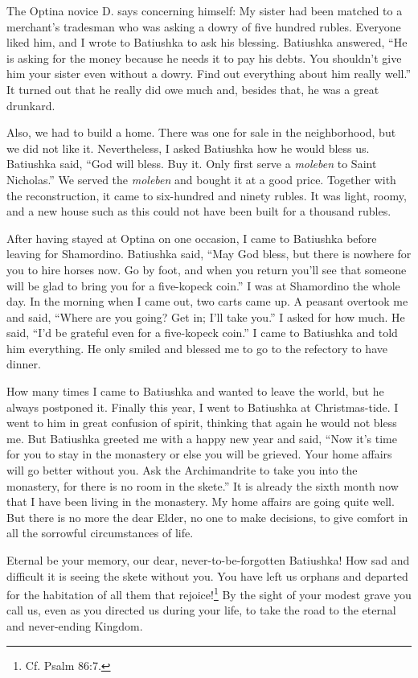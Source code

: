 \begin{longquote}{The Optina novice D. says concerning himself:}
My sister had been matched to a merchant's tradesman who was asking a dowry of five hundred rubles. Everyone liked him, and I wrote to Batiushka to ask his blessing. Batiushka answered, ``He is asking for the money because he needs it to pay his debts. You shouldn't give him your sister even without a dowry. Find out everything about him really well.'' It turned out that he really did owe much and, besides that, he was a great drunkard.

Also, we had to build a home. There was one for sale in the neighborhood, but we did not like it. Nevertheless, I asked Batiushka how he would bless us. Batiushka said, ``God will bless. Buy it. Only first serve a \textit{moleben} to Saint Nicholas.'' We served the \textit{moleben} and bought it at a good price. Together with the reconstruction, it came to six-hundred and ninety rubles. It was light, roomy, and a new house such as this could not have been built for a thousand rubles.

After having stayed at Optina on one occasion, I came to Batiushka before leaving for Shamordino. Batiushka said, ``May God bless, but there is nowhere for you to hire horses now. Go by foot, and when you return you'll see that someone will be glad to bring you for a five-kopeck coin.'' I was at Shamordino the whole day. In the morning when I came out, two carts came up. A peasant overtook me and said, ``Where are you going? Get in; I'll take you.'' I asked for how much. He said, ``I'd be grateful even for a five-kopeck coin.'' I came to Batiushka and told him everything. He only smiled and blessed me to go to the refectory to have dinner.

How many times I came to Batiushka and wanted to leave the world, but he always postponed it. Finally this year, I went to Batiushka at Christmas-tide. I went to him in great confusion of spirit, thinking that again he would not bless me. But Batiushka greeted me with a happy new year and said, ``Now it's time for you to stay in the monastery or else you will be grieved. Your home affairs will go better without you. Ask the Archimandrite to take you into the monastery, for there is no room in the skete.'' It is already the sixth month now that I have been living in the monastery. My home affairs are going quite well. But there is no more the dear Elder, no one to make decisions, to give comfort in all the sorrowful circumstances of life.

Eternal be your memory, our dear, never-to-be-forgotten Batiushka! How sad and difficult it is seeing the skete without you. You have left us orphans and departed for the habitation of all them that rejoice!\footnote{Cf. Psalm 86:7.} By the sight of your modest grave you call us, even as you directed us during your life, to take the road to the eternal and never-ending Kingdom.
\end{longquote}


